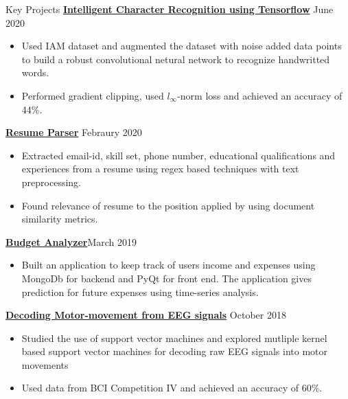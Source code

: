 \documentclass{resume} %
\begin{document}
\begin{rSection}{Key Projects}
\vspace*{0.1in}
{ \bf \href{https://github.com/arunpalaniappan/Handwriting-Recognition-using-Tensorflow}{Intelligent Character Recognition using Tensorflow}} {\hfill June 2020}
\begin{itemize}
\item Used IAM dataset and augmented the dataset with noise added data points to build a robust convolutional netural network to recognize handwritted words.
\item Performed gradient clipping, used $l_{\infty}$-norm loss and achieved an accuracy of 44\%.
\end{itemize}

{\bf \href{https://github.com/arunpalaniappan/resume-parser}{Resume Parser}} {\hfill Febraury 2020}
\begin{itemize}
\item Extracted email-id, skill set, phone number, educational qualifications and experiences from a resume using regex based techniques with text preprocessing.
\item Found relevance of resume to the position applied by using document similarity metrics.
\end{itemize}

{\bf \href{https://github.com/arunpalaniappan/budget-analyzer}{Budget Analyzer}}{\hfill March 2019}
\begin{itemize}
\item Built an application to keep track of users income and expenses using MongoDb for backend and PyQt for front end.  The application gives prediction for future expenses using time-series analysis.
\end{itemize}

{\bf \href{https://github.com/arunpalaniappan/Decoding-raw-EEG-signals}{Decoding Motor-movement from EEG signals}} {\hfill October 2018}
\begin{itemize}
\item Studied the use of support vector machines and explored mutliple kernel based support vector machines for decoding raw EEG signals into motor movements
\item Used data from BCI Competition IV and achieved an accuracy of 60\%.
\end{itemize}

\end{rSection}

\end{document}
